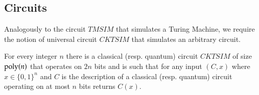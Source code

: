 \subsection{Circuits}

Analogously to the circuit $TMSIM$ that simulates a Turing Machine, we require the notion of universal circuit $CKTSIM$ that simulates an arbitrary circuit. 

\begin{lemma}\label{lem:cktsim}
For every integer $n$ there is a classical (resp. quantum) circuit $CKTSIM$ of size $\operatorname{poly}(n)$ that operates on $2n$ bits and is such that for any input $(C,x)$ where $x\in\{0,1\}^n$ and $C$ is the description of a classical (resp. quantum) circuit operating on at most $n$ bits returns $C(x)$. 
\end{lemma}

